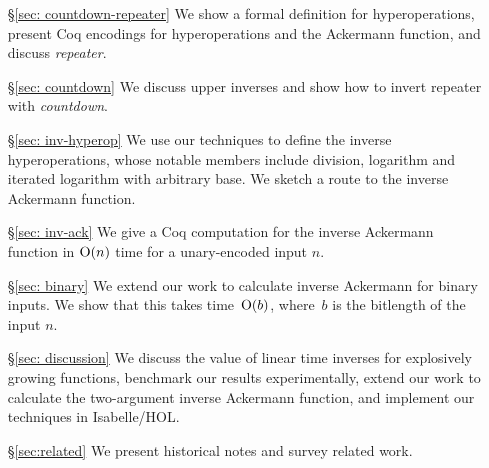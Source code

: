 \begin{itemize}
    \item[\S\ref{sec: countdown-repeater}] We show a formal definition for hyperoperations, \lb present Coq encodings for hyperoperations and the Ackermann function, and discuss \emph{repeater}.
    \item[\S\ref{sec: countdown}] We discuss upper inverses and show how to invert repeater with \emph{countdown}.
    \item[\S\ref{sec: inv-hyperop}] We use our techniques to define the inverse hyperoperations, whose notable members include division, logarithm and iterated logarithm with arbitrary base. We sketch a route to the inverse Ackermann function.
    \item[\S\ref{sec: inv-ack}] We give a Coq computation for the inverse Ackermann function in $\text{O}(n)$ time for a unary-encoded input $n$.
    \item[\S\ref{sec: binary}] We extend our work to calculate inverse Ackermann for binary inputs. We show that this takes time~$\text{O}(b)$, where~$b$ is the bitlength of the input $n$.
    \item[\S\ref{sec: discussion}] We discuss the value of linear time inverses for
    explosively growing functions, benchmark our results experimentally, extend our work to calculate the two-argument inverse Ackermann function, and 
    implement our techniques in Isabelle/HOL.
    \item[\S\ref{sec:related}] We present historical notes and survey related work.
\end{itemize}
